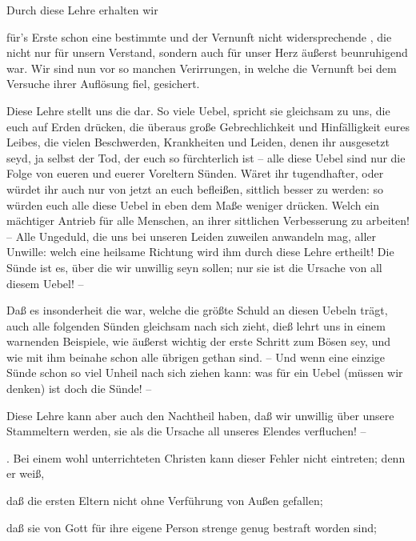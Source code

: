 Durch diese Lehre erhalten wir
\begin{aufza}
\item für's Erste schon eine bestimmte und der Vernunft nicht widersprechende , die nicht nur für unsern Verstand, sondern auch für unser Herz äußerst beunruhigend war. Wir sind nun vor so manchen Verirrungen, in welche die Vernunft bei dem Versuche ihrer Auflösung fiel, gesichert.
\item Diese Lehre stellt uns die  dar. So viele Uebel, spricht sie gleichsam zu uns, die euch auf Erden drücken, die überaus große Gebrechlichkeit und Hinfälligkeit eures Leibes, die vielen Beschwerden, Krankheiten und Leiden, denen ihr ausgesetzt seyd, ja selbst der Tod, der euch so fürchterlich ist -- alle diese Uebel sind nur die Folge von eueren und euerer Voreltern Sünden. Wäret ihr tugendhafter, oder würdet ihr auch nur von jetzt an euch befleißen, sittlich besser zu werden: so würden euch alle diese Uebel in eben dem Maße weniger drücken. Welch ein mächtiger Antrieb für alle Menschen, an ihrer sittlichen Verbesserung zu arbeiten! -- Alle Ungeduld, die uns bei unseren Leiden zuweilen anwandeln mag, aller Unwille: welch eine heilsame Richtung wird ihm durch diese Lehre ertheilt! Die Sünde ist es, über die wir unwillig seyn sollen; nur sie ist die Ursache von all diesem Uebel! --
\item Daß es insonderheit die  war, welche die größte Schuld an diesen Uebeln trägt, auch alle folgenden Sünden gleichsam nach sich zieht, dieß lehrt uns in einem warnenden Beispiele, wie äußerst wichtig der erste Schritt zum Bösen sey, und wie mit ihm beinahe schon alle übrigen gethan sind. -- Und wenn eine einzige Sünde schon so viel Unheil nach sich ziehen kann: was für ein Uebel (müssen wir denken) ist doch die Sünde! --\par
{} Diese Lehre kann aber auch den Nachtheil haben, daß wir unwillig über unsere Stammeltern werden, sie als die Ursache all unseres Elendes verfluchen! --\par
{}. Bei einem wohl unterrichteten Christen kann dieser Fehler nicht eintreten; denn er weiß,
\begin{aufzb}
\item daß die ersten Eltern nicht ohne Verführung von Außen gefallen;
\item daß sie von Gott für ihre eigene Person strenge genug bestraft worden sind;

\end{aufzb}
\end{aufza}
